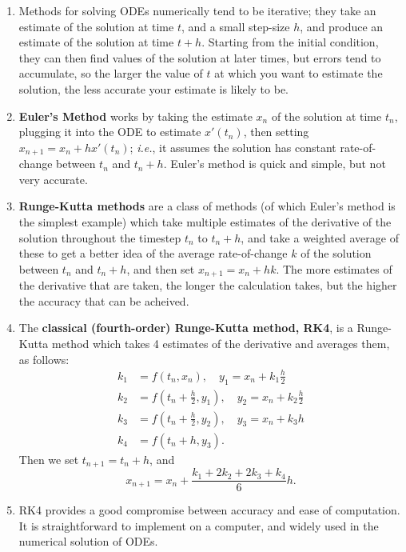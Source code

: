 \documentclass{article}
\begin{document}
\begin{enumerate}
	\item Methods for solving ODEs numerically tend to be iterative; they take an estimate of the solution at time $t$, and a small step-size $h$, and produce an estimate of the solution at time $t+h$. Starting from the initial condition, they can then find values of the solution at later times, but errors tend to accumulate, so the larger the value of $t$ at which you want to estimate the solution, the less accurate your estimate is likely to be.
	\item \textbf{Euler's Method} works by taking the estimate $x_n$ of the solution at time $t_n$, plugging it into the ODE to estimate $x'(t_n)$, then setting $x_{n+1}=x_n+hx'(t_n)$; \textit{i.e.}, it assumes the solution has constant rate-of-change between $t_n$ and $t_n+h$. Euler's method is quick and simple, but not very accurate.
	\item \textbf{Runge-Kutta methods} are a class of methods (of which Euler's method is the simplest example) which take multiple estimates of the derivative of the solution throughout the timestep $t_n$ to $t_n+h$, and take a weighted average of these to get a better idea of the average rate-of-change $k$ of the solution between $t_n$ and $t_n+h$, and then set $x_{n+1}=x_n+hk$. The more estimates of the derivative that are taken, the longer the calculation takes, but the higher the accuracy that can be acheived.
	\item The \textbf{classical (fourth-order) Runge-Kutta method, RK4}, is a Runge-Kutta method which takes 4 estimates of the derivative and averages them, as follows:
		\begin{align*}
			k_1 &= f(t_n,x_n),\quad y_1=x_n+k_1\frac{h}{2}\\
			k_2&=f\left(t_n+\frac{h}{2},y_1\right),\quad y_2=x_n+k_2\frac{h}{2}\\
			k_3&=f\left(t_n+\frac{h}{2},y_2\right),\quad y_3=x_n+k_3h\\
			k_4&=f(t_n+h,y_3).
		\end{align*}
		Then we set $t_{n+1}=t_n+h$, and
		\[x_{n+1}=x_n + \frac{k_1+2k_2+2k_3+k_4}{6}h.\]
	\item RK4 provides a good compromise between accuracy and ease of computation. It is straightforward to implement on a computer, and widely used in the numerical solution of ODEs.
\end{enumerate}
\end{document}
